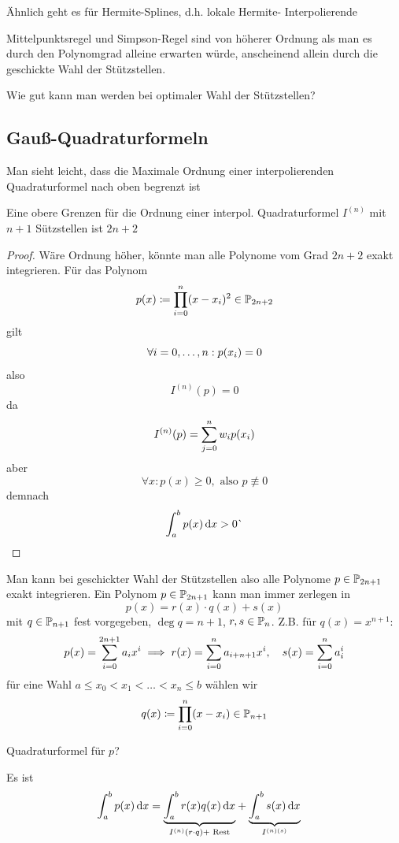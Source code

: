\documentclass{../Skript}
\begin{document}
\begin{remark}
    Ähnlich geht es für Hermite-Splines, d.h. lokale Hermite-
    Interpolierende
\end{remark}
\begin{motivation}
    Mittelpunktsregel und Simpson-Regel sind von höherer Ordnung als 
    man es durch 
    den Polynomgrad alleine erwarten würde, anscheinend allein durch 
    die 
    geschickte Wahl der Stützstellen. 
\end{motivation}
\begin{question}
    Wie gut kann man werden bei optimaler Wahl der Stützstellen?
\end{question}
\subsection{Gauß-Quadraturformeln}
Man sieht leicht, dass die Maximale Ordnung einer interpolierenden 
Quadraturformel nach oben begrenzt ist
\begin{lemma}
    Eine obere Grenzen für die Ordnung einer interpol. Quadraturformel 
    $I^{(n)}$ 
    mit $n+1$ Sützstellen ist $2n+2$
\end{lemma}
\begin{proof}
    Wäre Ordnung höher, könnte man alle Polynome vom Grad $2n+2$ exakt 
    integrieren. Für das Polynom \[
        p(x) \coloneqq \prod_{i=0}^n(x-x_i)^2 \in \mathbb{P}_{2n+2}
    \]
    gilt \[
    \forall \igb i 0 n: p(x_i) = 0
    \]
    also \[
        I^{(n)}(p) = 0
    \]
    da \[
        I^{(n)}(p) = \displaystyle\sum_{j=0}^n w_ip(x_i)
    \]
    aber \[
    \forall x: p(x) \geq 0, \text{ also }p\not\equiv 0
    \]  
    demnach \[
        \int_a^b p(x)\mathop{}\!\mathrm{d} x > 0 \lightning
    \]    
\end{proof}
Man kann bei geschickter Wahl der Stützstellen also alle Polynome $p\in\mathbb{P}_{2n+1}$ exakt integrieren.
Ein Polynom $p\in\mathbb{P}_{2n+1}$ kann man immer zerlegen in \[
    p(x) = r(x) \cdot q(x) + s(x)\]
mit $q\in \mathbb{P}_{n+1}$ fest vorgegeben, $\deg{q} = n+1$, $r,s\in \mathbb{P}_n$.
Z.B. für $q(x) =x^{n+1}$: \[
    p(x) = \displaystyle\sum_{i=0}^{2n+1}a_ix^i \implies r(x) = \sum_{i=0}^n a_{i+n+1}x^i, \hspace{1em} s(x) = \sum_{i=0}^na_i^i\]
für eine Wahl $a \leq x_0 < x_1 < \dots < x_n \leq b$ wählen wir \[
    q(x) \coloneqq \prod_{i=0}^n(x-x_i) \in \mathbb{P}_{n+1}\]
\begin{question}Quadraturformel für $p$?
\end{question}
Es ist \begin{align*}
    \int_a^b p(x) \mathop{}\!\mathrm{d} x &= \underset{I^{(n)}(r\cdot q) + \text{ Rest}}{\underbrace{\int_a^b r(x) q(x) \mathop{}\!\mathrm{d} x}} + \underset{I^{(n)(s)}}{\underbrace{\int_a^b s(x)\mathop{}\!\mathrm{d} x}}
\end{align*}
\end{document}
